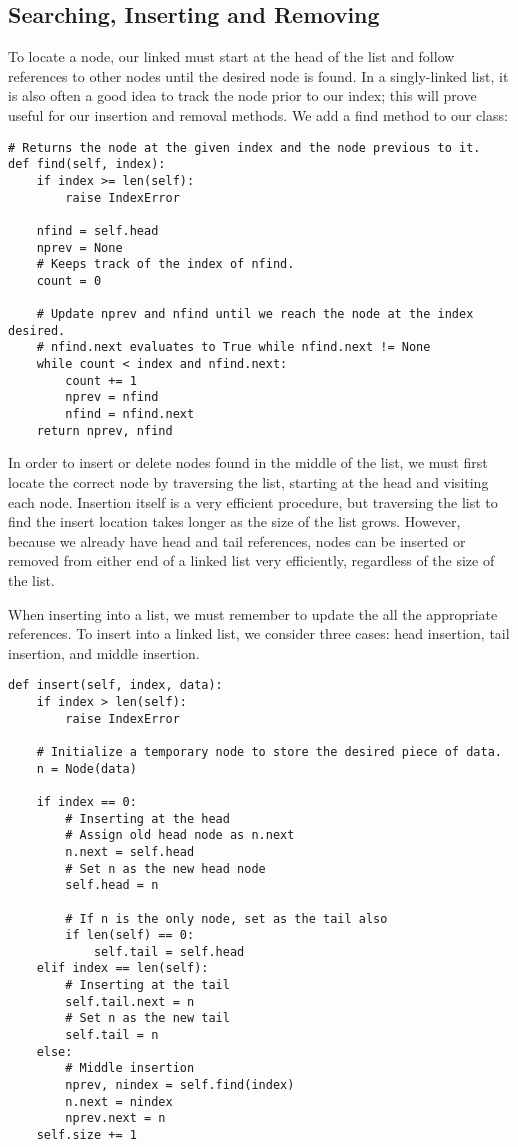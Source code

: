 \subsection*{Searching, Inserting and Removing}
To locate a node, our linked must start at the head of the list and follow references to other nodes until the desired node is found.
In a singly-linked list, it is also often a good idea to track the node prior to our index; this will prove useful for our insertion and removal methods. 
We add a find method to our  class:
\begin{lstlisting}
# Returns the node at the given index and the node previous to it.
def find(self, index):
    if index >= len(self):
        raise IndexError

    nfind = self.head
    nprev = None
    # Keeps track of the index of nfind.
    count = 0

    # Update nprev and nfind until we reach the node at the index desired.
    # nfind.next evaluates to True while nfind.next != None
    while count < index and nfind.next:
        count += 1
        nprev = nfind
        nfind = nfind.next
    return nprev, nfind
\end{lstlisting}

In order to insert or delete nodes found in the middle of the list, we must first locate the correct node by traversing the list, starting at the head and visiting each node.
Insertion itself is a very efficient procedure, but traversing the list to find the insert location takes longer as the size of the list grows. 
However, because we already have head and tail references, nodes can be inserted or removed from either end of a linked list very efficiently, regardless of the size of the list.

When inserting into a list, we must remember to update the all the appropriate references.
To insert into a linked list, we consider three cases: head insertion, tail insertion, and middle insertion. 
\begin{lstlisting}
def insert(self, index, data):
    if index > len(self):
        raise IndexError
        
    # Initialize a temporary node to store the desired piece of data.
    n = Node(data)
    
    if index == 0:
        # Inserting at the head
        # Assign old head node as n.next
        n.next = self.head
        # Set n as the new head node
        self.head = n
        
        # If n is the only node, set as the tail also
        if len(self) == 0:
            self.tail = self.head
    elif index == len(self):
        # Inserting at the tail
        self.tail.next = n
        # Set n as the new tail
        self.tail = n
    else: 
        # Middle insertion
        nprev, nindex = self.find(index)
        n.next = nindex
        nprev.next = n
    self.size += 1
\end{lstlisting}

